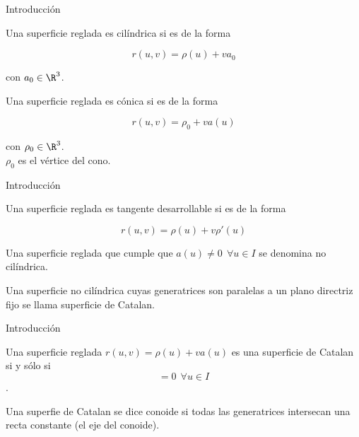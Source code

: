 \documentclass[10pt]{beamer}
\begin{document}
	\begin{frame}{Introducción}
		\begin{defi}
			Una superficie reglada es cilíndrica si es de la forma 
			
			\begin{equation}
			r(u,v) = \rho(u) + v a_0
			\end{equation}
			
			con $a_0 \in \R^3$.
		\end{defi}
		
		\begin{defi}
			Una superficie reglada es cónica si es de la forma 
			
			\begin{equation}
			r(u,v) = \rho_0 + v a(u)
			\end{equation}
			
			con $\rho_0 \in \R^3$.\\
			
			$\rho_0$ es el vértice del cono.
		\end{defi}
	\end{frame}
	
	\begin{frame}{Introducción}
			\begin{defi}
				Una superficie reglada es tangente desarrollable si es de la forma 
				
				\begin{equation}
				r(u,v) = \rho(u) + v \rho'(u)
				\end{equation}
			\end{defi}
			
			\begin{defi}
				Una superficie reglada que cumple que $a(u) \neq 0 \ \ \forall u \in I$ se denomina no cilíndrica. 
			\end{defi}
			
			\begin{defi}
				Una superficie no cilíndrica cuyas generatrices son paralelas a un plano directriz fijo se llama superficie de Catalan.
			\end{defi}
			
	\end{frame}
	
	\begin{frame}{Introducción}
		\begin{teo}
			Una superficie reglada $r(u,v) = \rho(u) + v a(u)$ es una superficie de Catalan si y sólo si
			\begin{equation}
			[a(u), a'(a), a''(u)] = 0  \ \ \forall u \in I
			\end{equation}.
		\end{teo}
		
		\begin{defi}
			Una superfie de Catalan se dice conoide si todas las generatrices intersecan una recta constante (el eje del conoide).
		\end{defi}
		
	
	\end{frame}
	
\end{document}
